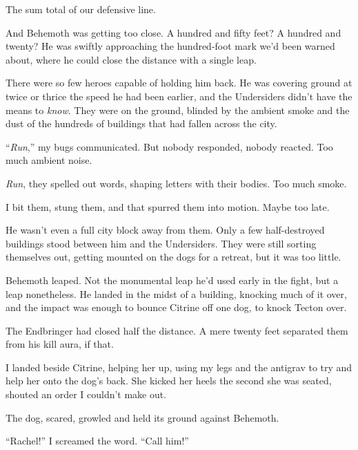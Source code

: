 The sum total of our defensive line.



And Behemoth was getting too close.  A hundred and fifty feet?  A hundred and twenty? He was swiftly approaching the hundred-foot mark we'd been warned about, where he could close the distance with a single leap.



There were so few heroes capable of holding him back.  He was covering ground at twice or thrice the speed he had been earlier, and the Undersiders didn't have the means to \emph{know}.  They were on the ground, blinded by the ambient smoke and the dust of the hundreds of buildings that had fallen across the city.



``\emph{Run},'' my bugs communicated.  But nobody responded, nobody reacted.  Too much ambient noise.



\emph{Run}, they spelled out words, shaping letters with their bodies.  Too much smoke.



I bit them, stung them, and that spurred them into motion.  Maybe too late.



He wasn't even a full city block away from them.  Only a few half-destroyed buildings stood between him and the Undersiders.  They were still sorting themselves out, getting mounted on the dogs for a retreat, but it was too little.



Behemoth leaped.  Not the monumental leap he'd used early in the fight, but a leap nonetheless.  He landed in the midst of a building, knocking much of it over, and the impact was enough to bounce Citrine off one dog, to knock Tecton over.



The Endbringer had closed half the distance.  A mere twenty feet separated them from his kill aura, if that.



I landed beside Citrine, helping her up, using my legs and the antigrav to try and help her  onto the dog's back.  She kicked her heels the second she was seated, shouted an order I couldn't make out.



The dog, scared, growled and held its ground against Behemoth.



``Rachel!'' I screamed the word.  ``Call him!''



